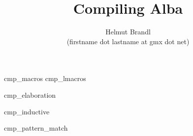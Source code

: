 \documentclass[12pt]{article}
\begin{document}


\title{
    Compiling Alba
}

\author{
    Helmut Brandl
    \\
    \scriptsize (firstname dot lastname at gmx dot net)
}
\date{}

\maketitle




\tableofcontents

 {cmp_macros}
 {cmp_lmacros}



 {cmp_elaboration}

 {cmp_inductive}

{
    \def\ct{f_\text{ct}}

     {cmp_pattern_match}
}
\end{document}
